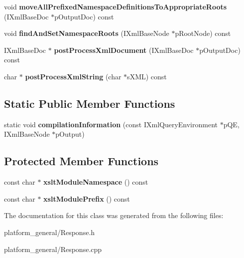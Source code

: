 \begin{DoxyCompactItemize}
\item 
\hypertarget{classgeneral__server_1_1Response_a77e8298a0af89ae1c667effe1e961125}{void {\bfseries move\-All\-Prefixed\-Namespace\-Definitions\-To\-Appropriate\-Roots} (\-I\-Xml\-Base\-Doc $\ast$p\-Output\-Doc) const }\label{classgeneral__server_1_1Response_a77e8298a0af89ae1c667effe1e961125}

\item 
\hypertarget{classgeneral__server_1_1Response_a7bc46be07e033139ffc9338e09605a69}{void {\bfseries find\-And\-Set\-Namespace\-Roots} (\-I\-Xml\-Base\-Node $\ast$p\-Root\-Node) const }\label{classgeneral__server_1_1Response_a7bc46be07e033139ffc9338e09605a69}

\item 
\hypertarget{classgeneral__server_1_1Response_a23085b7d52089a111ab2139e129cff50}{\-I\-Xml\-Base\-Doc $\ast$ {\bfseries post\-Process\-Xml\-Document} (\-I\-Xml\-Base\-Doc $\ast$p\-Output\-Doc) const }\label{classgeneral__server_1_1Response_a23085b7d52089a111ab2139e129cff50}

\item 
\hypertarget{classgeneral__server_1_1Response_a3d239edc9f0bbed75ffda10fda186ad8}{char $\ast$ {\bfseries post\-Process\-Xml\-String} (char $\ast$s\-X\-M\-L) const }\label{classgeneral__server_1_1Response_a3d239edc9f0bbed75ffda10fda186ad8}

\end{DoxyCompactItemize}
\subsection*{\-Static \-Public \-Member \-Functions}
\begin{DoxyCompactItemize}
\item 
\hypertarget{classgeneral__server_1_1Response_acc5cfe2bdffa12611ee464413ee13b6d}{static void {\bfseries compilation\-Information} (const \-I\-Xml\-Query\-Environment $\ast$p\-Q\-E, \-I\-Xml\-Base\-Node $\ast$p\-Output)}\label{classgeneral__server_1_1Response_acc5cfe2bdffa12611ee464413ee13b6d}

\end{DoxyCompactItemize}
\subsection*{\-Protected \-Member \-Functions}
\begin{DoxyCompactItemize}
\item 
\hypertarget{classgeneral__server_1_1Response_a4cb406ed65c990c700f70c2d1529e8c7}{const char $\ast$ {\bfseries xslt\-Module\-Namespace} () const }\label{classgeneral__server_1_1Response_a4cb406ed65c990c700f70c2d1529e8c7}

\item 
\hypertarget{classgeneral__server_1_1Response_ae953153cc088c88917923cf057f9906e}{const char $\ast$ {\bfseries xslt\-Module\-Prefix} () const }\label{classgeneral__server_1_1Response_ae953153cc088c88917923cf057f9906e}

\end{DoxyCompactItemize}


\-The documentation for this class was generated from the following files\-:\begin{DoxyCompactItemize}
\item 
platform\-\_\-general/\-Response.\-h\item 
platform\-\_\-general/\-Response.\-cpp\end{DoxyCompactItemize}
